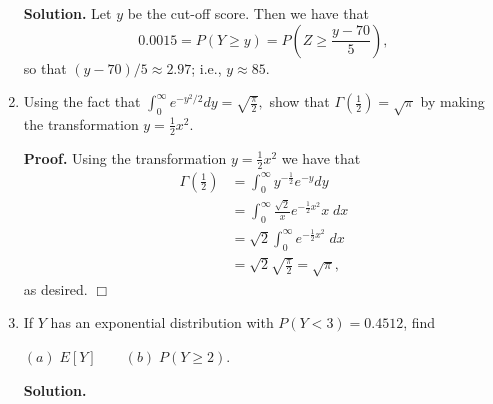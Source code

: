 \documentclass[9pt]{article}
\newcommand{\qed}{\hfill \ensuremath{\Box}}
\newcommand{\D}{\displaystyle}
\begin{document}
\begin{enumerate}
      \textbf{Solution.} Let $y$ be the cut-off score. Then we have that
      $$0.0015 = P(Y \ge y) = P\left(Z \ge \frac{y - 70}{5}\right),$$
      so that $(y-70)/5 \approx 2.97$; i.e., $y \approx 85$.
   \item Using the fact that
         $\D\int_0^\infty e^{-y^2/2} dy = \sqrt{\frac{\pi}{2}},$ show that
         $\D\Gamma\left(\frac{1}{2}\right) = \sqrt{\pi}$ by making the 
         transformation $y = \frac{1}{2} x^2$.

      \textbf{Proof.} Using the transformation $y = \frac{1}{2} x^2$ we have
      that
      \begin{align*}
         \Gamma\left(\frac{1}{2}\right) &=
            \int_0^\infty y^{-\frac{1}{2}}e^{-y} dy \\
         &= \int_0^\infty \frac{\sqrt{2}}{x} e^{-\frac{1}{2}x^2} x \; dx \\
         &= \sqrt{2}\int_0^\infty  e^{-\frac{1}{2}x^2} \; dx \\
         &= \sqrt{2} \sqrt{\frac{\pi}{2}} = \sqrt{\pi},
      \end{align*}
      as desired. \qed
   \item If $Y$ has an exponential distribution with $P(Y < 3) = 0.4512$, find

         $(a)\; E[Y] \qquad (b)\; P(Y \ge 2)$.

      \textbf{Solution.}


\end{enumerate}
\end{document}
